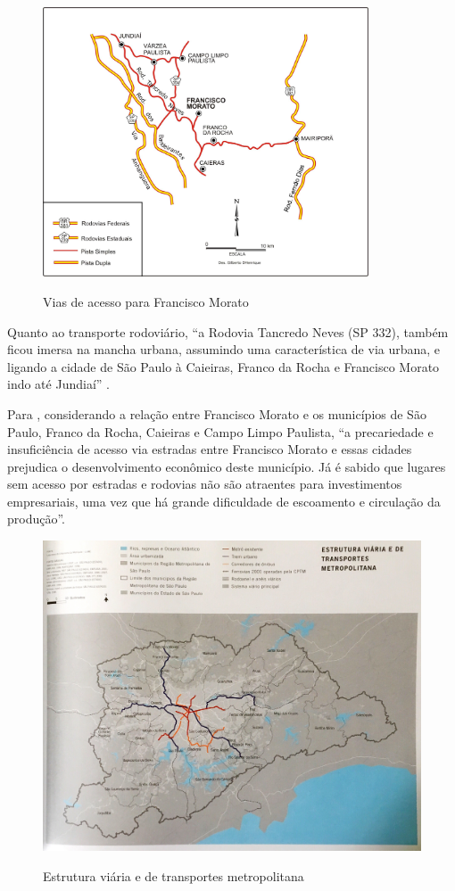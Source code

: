 	\begin{figure}[H]
		\centering
		\caption{Vias de acesso para Francisco Morato}
		\includegraphics[height=8cm]{img/cassiele_vias_acesso}
		\label{fig:vias_acesso}
	\end{figure}
    
    Quanto ao transporte rodoviário, ``a Rodovia Tancredo Neves (SP 332), também ficou imersa na mancha urbana, assumindo uma característica de via urbana, e ligando a cidade de São Paulo à Caieiras, Franco da Rocha e Francisco Morato indo até Jundiaí'' \cite[p.49]{suarez2014a}.
	
	Para , considerando a relação entre Francisco Morato e os municípios de São Paulo, Franco da Rocha, Caieiras e Campo	Limpo Paulista, ``a precariedade e insuficiência de acesso via estradas entre Francisco Morato e essas cidades prejudica o desenvolvimento econômico deste município. Já é sabido que lugares sem acesso por estradas e rodovias não são atraentes para investimentos empresariais, uma vez que há grande dificuldade de escoamento e circulação da produção''.
	
	\begin{figure}[h]
		\centering
		\caption{Estrutura viária e de transportes metropolitana}
		\includegraphics[width=\linewidth,keepaspectratio]{img/spmetrop_pag075}
		\label{spmetrop_pag075}
	\end{figure}	
	
